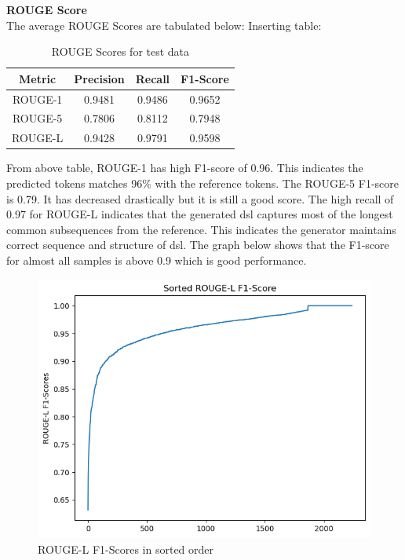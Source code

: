 \textbf{ROUGE Score}\\
The average ROUGE Scores are tabulated below:
    Inserting table:
    \begin{table}[H]
        \caption{ROUGE Scores for test data}
        \label{tab:sample}
        \centering
        \begin{tabular}{|c|c|c|c|}
            \hline
            \textbf{Metric} & \textbf{Precision} & \textbf{Recall} &\textbf{F1-Score}\\
            \hline
            ROUGE-1 & 0.9481 & 0.9486 &0.9652 \\
            \hline
            ROUGE-5 & 0.7806&0.8112 & 0.7948 \\
            \hline
            ROUGE-L & 0.9428 & 0.9791 & 0.9598 \\
            \hline
        \end{tabular}
    \end{table}
    From above table, ROUGE-1 has high F1-score of 0.96. This indicates the predicted
tokens matches 96\% with the reference tokens. The ROUGE-5 F1-score is 0.79. It has
decreased drastically but it is still a good score. The high recall of 0.97 for ROUGE-L
indicates that the generated \gls{dsl} captures most of the longest common subsequences
from the reference. This indicates the generator maintains correct sequence and structure of \gls{dsl}. The graph below shows that the F1-score for almost all samples is
above 0.9 which is good performance.
 \begin{figure}[H]
        \includegraphics[scale=.8]{images/rouge-L F1-scores in sorted order.png}
        \centering
        \caption{ROUGE-L F1-Scores in sorted order}
        \label{fig:rouge-l-F1 score}
    \end{figure}
